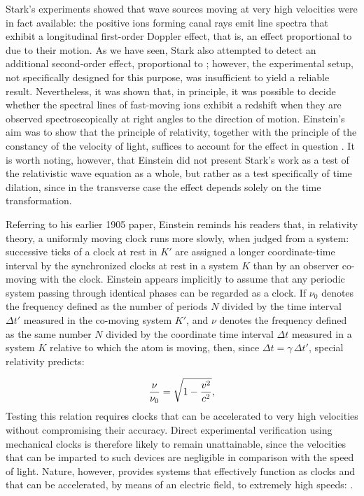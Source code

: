 \documentclass[pdflatex]{sn-jnl}
\begin{document}
Stark’s experiments showed that wave sources moving at very high velocities were in fact available: the positive ions forming canal rays emit line spectra that exhibit a longitudinal first-order Doppler effect, that is, an effect proportional to \betafactorh due to their motion. As we have seen, Stark also attempted to detect an additional second-order effect, proportional to \betafactorsquaredh; however, the experimental setup, not specifically designed for this purpose, was insufficient to yield a reliable result. Nevertheless, it was shown that, in principle, it was possible to decide whether the spectral lines of fast-moving ions exhibit a redshift when they are observed spectroscopically at right angles to the direction of motion. Einstein’s aim was to show that the principle of relativity, together with the principle of the constancy of the velocity of light, suffices to account for the effect in question \citep[197]{Einstein1907d}. It is worth noting, however, that Einstein did not present Stark’s work as a test of the relativistic wave equation as a whole, but rather as a test specifically of time dilation, since in the transverse case the effect depends solely on the time transformation.

Referring to his earlier 1905 paper, Einstein reminds his readers that, in relativity theory, a uniformly moving clock runs more slowly, when judged from a  system: successive ticks of a clock at rest in $K'$ are assigned a longer coordinate-time interval by the synchronized clocks at rest in a  system $K$ than by an observer co-moving with the clock. Einstein appears implicitly to assume that any periodic system passing through identical phases can be regarded as a clock. If $\nu_0$ denotes the frequency defined as the number of periods $N$ divided by the time interval $\Delta t'$ measured in the co-moving system $K'$, and $\nu$ denotes the frequency defined as the same number $N$ divided by the coordinate time interval $\Delta t$ measured in a system $K$ relative to which the atom is moving, then, since $\Delta t=\gamma\,\Delta t'$, special relativity predicts:


\begin{equation}\label{eq:doppler}
\frac{\nu}{\nu_0}=\sqrt{1-\frac{v^2}{c^2}},
\end{equation}
%
Testing this relation requires clocks that can be accelerated to very high velocities without compromising their accuracy. Direct experimental verification using mechanical clocks is therefore likely to remain unattainable, since the velocities that can be imparted to such devices are negligible in comparison with the speed of light. Nature, however, provides systems that effectively function as clocks and that can be accelerated, by means of an electric field, to extremely high speeds:  \citep[198]{Einstein1907d}.
\end{document}
